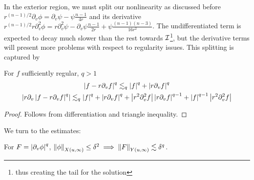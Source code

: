 \documentclass[11pt, oneside]{amsart}
\begin{document}
	In the exterior region, we must split our nonlinearity as discussed before $r^{(n-1)/2}\partial_v\phi=\partial_v\psi-\psi\frac{n-1}{4r}$ and its derivative $r^{(n-1)/2}r\partial_v^2\phi=r\partial_v^2\psi-\partial_v\psi\frac{n-1}{2r}+\psi\frac{(n-1)(n-3)}{16r^2}$. The undifferentiated term is expected to decay much slower than the rest towards $\mathcal{I}$\footnote{thus creating the tail for the solution}, but the derivative terms will present more problems with respect to regularity issues. This splitting is captured by
	\begin{lemma}
		For $f$ sufficiently regular, $q>1$
		\begin{equation*}
			\begin{gathered}
				\left\lvert f-r\partial_vf\right\rvert^q\lesssim_q \left\lvert f\right\rvert^q+\left\lvert r\partial_v f\right\rvert^q\\
				\left\lvert r\partial_v\left\lvert f-r\partial_vf\right\rvert^q\right\rvert\lesssim_q \left\lvert f\right\rvert^q+\left\lvert r\partial_vf\right\rvert^q+\left\lvert r^2\partial_v^2f\right\rvert\left\lvert r\partial_vf\right\rvert^{q-1}+\left\lvert f\right\rvert^{q-1}\left\lvert r^2\partial_v^2f\right\rvert
			\end{gathered}
		\end{equation*}
	\end{lemma}
	\begin{proof}
		Follows from differentiation and triangle inequality.
	\end{proof}
	We turn to the estimates:
	\begin{lemma}		For $F=\left\lvert \partial_v\phi\right\rvert^q$,  $\left\lVert \phi\right\rVert_{X(u,\infty)}\leq\delta^2\implies\left\lVert F\right\rVert_{Y(u,\infty)}\lesssim\delta^q$.
	\end{lemma}
\end{document}
